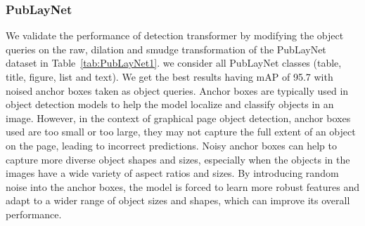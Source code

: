 \documentclass[sn-mathphys]{sn-jnl}\jyear{2021}\theoremstyle{thmstyleone}\newtheorem{theorem}{Theorem}\newtheorem{proposition}[theorem]{Proposition}\theoremstyle{thmstyletwo}\newtheorem{example}{Example}\newtheorem{remark}{Remark}\theoremstyle{thmstylethree}\newtheorem{definition}{Definition}\usepackage{amsmath}
\begin{document}
\subsubsection{PubLayNet}
\label{sec:PubLayNet-result}
We validate the performance of detection transformer by modifying the object queries on the raw, dilation and smudge transformation of the PubLayNet dataset in Table~\ref{tab:PubLayNet1}. we consider all PubLayNet classes (table, title, figure, list and text). We get the best results having mAP of 95.7  with noised anchor boxes taken as object queries. Anchor boxes are typically used in object detection models to help the model localize and classify objects in an image. However, in the context of graphical page object detection, anchor boxes used are too small or too large, they may not capture the full extent of an object on the page, leading to incorrect predictions. Noisy anchor boxes can help to capture more diverse object shapes and sizes, especially when the objects in the images have a wide variety of aspect ratios and sizes. By introducing random noise into the anchor boxes, the model is forced to learn more robust features and adapt to a wider range of object sizes and shapes, which can improve its overall performance.  \\
\end{document}
